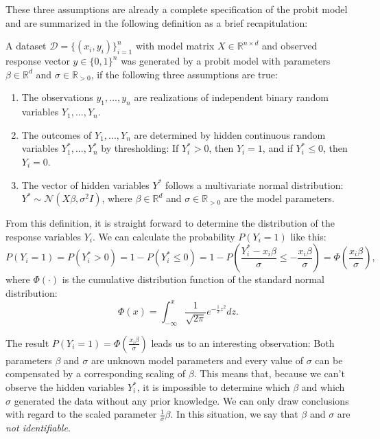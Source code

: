These three assumptions are already a complete specification of the
probit model and are summarized in the following definition as a
brief recapitulation:

\begin{definition}
    A dataset $\mathcal{D} = \{(x_i, y_i)\}_{i=1}^n$ with model matrix
    $X \in \mathbb{R}^{n \times d}$ and observed response vector
    $y \in \{0, 1\}^n$ was generated by a probit model with
    parameters $\beta \in \mathbb{R}^d$ and $\sigma \in \mathbb{R}_{>0}$, if
    the following three assumptions are true:
    \begin{enumerate}
        \item The observations $y_1, ..., y_n$ are realizations of independent
              binary random variables $Y_1, ..., Y_n$.
        \item The outcomes of $Y_1, ..., Y_n$ are determined by hidden
              continuous random variables $Y_1^\ast, ..., Y_n^\ast$ by
              thresholding: If $Y_i^\ast > 0$, then $Y_i = 1$, and if
              $Y_i^\ast \leq 0$, then $Y_i = 0$.
        \item The vector of hidden variables $Y^\ast$ follows a multivariate
              normal distribution:
              $Y^\ast \sim \mathcal{N}(X \beta, \sigma^2 I)$,
              where $\beta \in \mathbb{R}^d$ and $\sigma \in \mathbb{R}_{>0}$
              are the model parameters.
    \end{enumerate}
\end{definition}

From this definition, it is straight forward to determine the
distribution of the response variables $Y_i$.
We can calculate the probability $P(Y_i = 1)$ like this:
\begin{equation*}
    P(Y_i = 1) = P(Y_i^\ast > 0) = 1 - P(Y_i^\ast \leq 0)
    = 1 - P\left(\frac{Y_i^\ast - x_i \beta}{\sigma} \leq -\frac{x_i \beta}{\sigma} \right)
    = \Phi\left(\frac{x_i \beta}{\sigma} \right),
\end{equation*}
where $\Phi(\cdot)$ is the cumulative distribution function of the standard normal
distribution:
\begin{equation*}
    \Phi(x) = \int_{-\infty}^x \frac{1}{\sqrt{2 \pi}} e^{- \frac{1}{2} z^2} dz.
\end{equation*}

The result $P(Y_i = 1) = \Phi\left(\frac{x_i \beta}{\sigma} \right)$
leads us to an interesting observation:
Both parameters $\beta$ and $\sigma$ are unknown model parameters and
every value of $\sigma$ can be compensated by a corresponding scaling
of $\beta$. This means that, because we can't observe the hidden variables $Y_i^\ast$,
it is impossible to determine which $\beta$ and which $\sigma$
generated the data without any prior knowledge.
We can only draw conclusions with regard to the
scaled parameter $\frac{1}{\sigma}\beta$.
In this situation, we say that $\beta$ and $\sigma$ are
\textit{not identifiable}.

